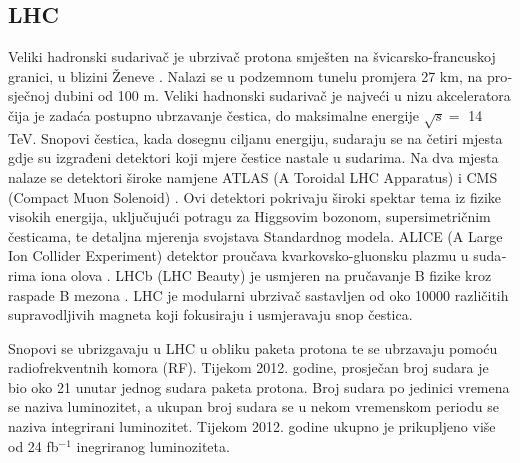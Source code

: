 \begin{otherlanguage}{croatian}
\section{LHC}
Veliki hadronski sudarivač je ubrzivač protona smješten na švicarsko-francuskoj granici, u blizini Ženeve \cite{Evans:2008zzb}. Nalazi se u podzemnom tunelu promjera 27 km, na prosječnoj dubini od 100 m. Veliki hadnonski sudarivač je najveći u nizu akceleratora čija je zadaća postupno ubrzavanje čestica, do maksimalne energije $\sqrt{s}=$ 14 TeV. Snopovi čestica, kada dosegnu ciljanu energiju, sudaraju se na četiri mjesta gdje su izgrađeni detektori koji mjere čestice nastale u sudarima. Na dva mjesta nalaze se detektori široke namjene ATLAS (A Toroidal LHC Apparatus) \cite{Aad:2008zzm} i CMS (Compact Muon Solenoid) \cite{Chatrchyan:2008aa}.  Ovi detektori pokrivaju široki spektar tema iz fizike visokih energija, uključujući potragu za Higgsovim bozonom, supersimetričnim česticama, te detaljna mjerenja svojstava Standardnog modela. ALICE (A Large Ion Collider Experiment) detektor proučava kvarkovsko-gluonsku plazmu u sudarima iona olova \cite{Aamodt:2008zz}. LHCb (LHC Beauty) je usmjeren na pručavanje B fizike kroz raspade B mezona \cite{Alves:2008zz}. LHC je modularni ubrzivač sastavljen od oko 10000 različitih supravodljivih magneta koji fokusiraju i usmjeravaju snop čestica.
\par Snopovi se ubrizgavaju u LHC u obliku paketa protona te se ubrzavaju pomoću radiofrekventnih komora (RF). Tijekom 2012. godine, prosječan broj sudara je bio oko 21 unutar jednog sudara paketa protona. Broj sudara po jedinici vremena se naziva luminozitet, a ukupan broj sudara se u nekom vremenskom periodu se naziva integrirani luminozitet. Tijekom 2012. godine ukupno je prikupljeno više od 24 fb$^{-1}$ inegriranog luminoziteta. 

 

\end{otherlanguage}
